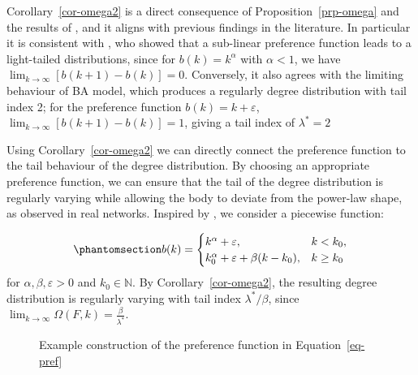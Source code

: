 \documentclass[
  sn-basic,
  10pt,
]{sn-jnl}
\theoremstyle{plain}
\theoremstyle{plain}
\theoremstyle{remark}
\begin{document}
Corollary~\ref{cor-omega2} is a direct consequence of
Proposition~\ref{prp-omega} and the results of \citet{shimura12}, and it
aligns with previous findings in the literature. In particular it is
consistent with \citet{krapivsky01}, who showed that a sub-linear
preference function leads to a light-tailed distributions, since for
\(b(k)=k^\alpha\) with \(\alpha<1\), we have
\(\lim_{k\rightarrow\infty}[b(k+1)-b(k)]=0\). Conversely, it also agrees
with the limiting behaviour of BA model, which produces a regularly
degree distribution with tail index 2; for the preference function
\(b(k)=k+\varepsilon\), \(\lim_{k\rightarrow\infty}[b(k+1)-b(k)]=1\),
giving a tail index of \(\lambda^*=2\)

Using Corollary~\ref{cor-omega2} we can directly connect the preference
function to the tail behaviour of the degree distribution. By choosing
an appropriate preference function, we can ensure that the tail of the
degree distribution is regularly varying while allowing the body to
deviate from the power-law shape, as observed in real networks. Inspired
by \citet{Lee24}, we consider a piecewise function:

\begin{equation}\phantomsection\label{eq-pref}{
b(k) = \begin{cases}
k^\alpha + \varepsilon,&k<k_0,\\
k_0^\alpha + \varepsilon + \beta(k-k_0), &k\ge k_0
\end{cases}
}\end{equation} for \(\alpha,\beta, \varepsilon>0\) and
\(k_0\in\mathbb N\). By Corollary~\ref{cor-omega2}, the resulting degree
distribution is regularly varying with tail index \(\lambda^*/\beta\),
since
\(\lim_{k\rightarrow\infty}\Omega(F,k) = \frac{\beta}{\lambda^*}\).

\begin{figure}


\caption{\label{fig-ex}Example construction of the preference function
in Equation~\ref{eq-pref}}

\end{figure}%
\end{document}
